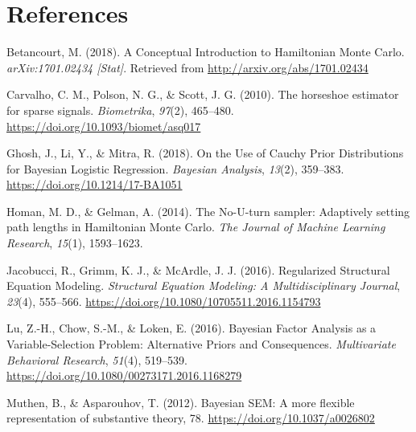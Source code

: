 \documentclass[
  english,
  man]{apa6}
\newlength{\cslhangindent}
\newlength{\cslentryspacingunit} %
\newenvironment{CSLReferences}[2] %
 {%
  \setlength{\parindent}{0pt}
  \ifodd #1
  \let\oldpar\par
  \def\par{\hangindent=\cslhangindent\oldpar}
  \fi
  \setlength{\parskip}{#2\cslentryspacingunit}
 }%
 {}
\begin{document}
\clearpage

\hypertarget{references}{%
\section{References}\label{references}}

\begingroup
\setlength{\parindent}{-0.5in}
\setlength{\leftskip}{0.5in}

\hypertarget{refs}{}
\begin{CSLReferences}{1}{0}
\leavevmode{}%
Betancourt, M. (2018). A {Conceptual} {Introduction} to {Hamiltonian} {Monte} {Carlo}. \emph{arXiv:1701.02434 {[}Stat{]}}. Retrieved from \url{http://arxiv.org/abs/1701.02434}

\leavevmode{}%
Carvalho, C. M., Polson, N. G., \& Scott, J. G. (2010). The horseshoe estimator for sparse signals. \emph{Biometrika}, \emph{97}(2), 465--480. \url{https://doi.org/10.1093/biomet/asq017}

\leavevmode{}%
Ghosh, J., Li, Y., \& Mitra, R. (2018). On the {Use} of {Cauchy} {Prior} {Distributions} for {Bayesian} {Logistic} {Regression}. \emph{Bayesian Analysis}, \emph{13}(2), 359--383. \url{https://doi.org/10.1214/17-BA1051}

\leavevmode{}%
Homan, M. D., \& Gelman, A. (2014). The {No}-{U}-turn sampler: Adaptively setting path lengths in {Hamiltonian} {Monte} {Carlo}. \emph{The Journal of Machine Learning Research}, \emph{15}(1), 1593--1623.

\leavevmode{}%
Jacobucci, R., Grimm, K. J., \& McArdle, J. J. (2016). Regularized {Structural} {Equation} {Modeling}. \emph{Structural Equation Modeling: A Multidisciplinary Journal}, \emph{23}(4), 555--566. \url{https://doi.org/10.1080/10705511.2016.1154793}

\leavevmode{}%
Lu, Z.-H., Chow, S.-M., \& Loken, E. (2016). Bayesian {Factor} {Analysis} as a {Variable}-{Selection} {Problem}: {Alternative} {Priors} and {Consequences}. \emph{Multivariate Behavioral Research}, \emph{51}(4), 519--539. \url{https://doi.org/10.1080/00273171.2016.1168279}

\leavevmode{}%
Muthen, B., \& Asparouhov, T. (2012). Bayesian {SEM}: {A} more ﬂexible representation of substantive theory, 78. \url{https://doi.org/10.1037/a0026802}


\end{CSLReferences}
\end{document}
